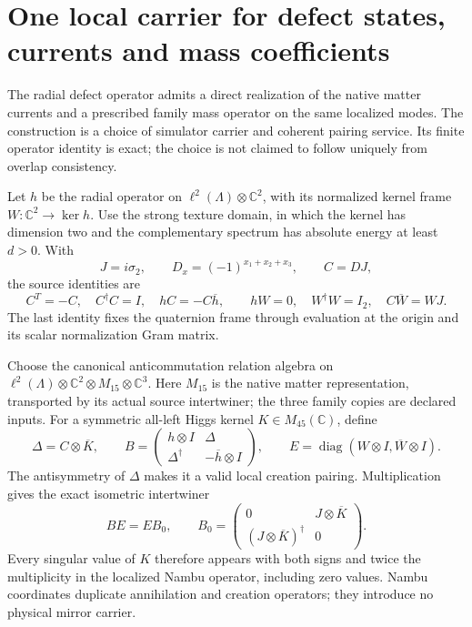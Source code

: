 \section{One local carrier for defect states, currents and mass coefficients}
\label{sec:defect-current-mass-bridge}

The radial defect operator admits a direct realization of the native matter
currents and a prescribed family mass operator on the same localized modes.
The construction is a choice of simulator carrier and coherent pairing
service. Its finite operator identity is exact; the choice is not claimed
to follow uniquely from overlap consistency.

Let $h$ be the radial operator on
$\ell^2(\Lambda)\otimes\mathbb C^2$, with its normalized kernel frame
$W:\mathbb C^2\to\ker h$. Use the strong texture domain, in which the
kernel has dimension two and the complementary spectrum has absolute
energy at least $d>0$. With
\[
 J=i\sigma_2,\qquad D_x=(-1)^{x_1+x_2+x_3},\qquad C=DJ,
\]
the source identities are
\[
 C^T=-C,\quad C^\dagger C=I,\quad hC=-C\overline h,
 \qquad hW=0,\quad W^\dagger W=I_2,\quad C\overline W=WJ.
\]
The last identity fixes the quaternion frame through evaluation at the
origin and its scalar normalization Gram matrix.

Choose the canonical anticommutation relation algebra on
$\ell^2(\Lambda)\otimes\mathbb C^2\otimes M_{15}\otimes\mathbb C^3$.
Here $M_{15}$ is the native matter representation, transported by its
actual source intertwiner; the three family copies are declared inputs.
For a symmetric all-left Higgs kernel $K\in M_{45}(\mathbb C)$, define
\[
 \Delta=C\otimes\overline K,\qquad
 B=\begin{pmatrix}h\otimes I&\Delta\\
                  \Delta^\dagger&-\overline h\otimes I\end{pmatrix},
 \qquad
 E=\operatorname{diag}(W\otimes I,\overline W\otimes I).
\]
The antisymmetry of $\Delta$ makes it a valid local creation pairing.
Multiplication gives the exact isometric intertwiner
\begin{equation}\label{eq:defect-current-mass-intertwiner}
 BE=EB_0,\qquad
 B_0=\begin{pmatrix}0&J\otimes\overline K\\
                    (J\otimes\overline K)^\dagger&0\end{pmatrix}.
\end{equation}
Every singular value of $K$ therefore appears with both signs and twice
the multiplicity in the localized Nambu operator, including zero values.
Nambu coordinates duplicate annihilation and creation operators; they
introduce no physical mirror carrier.

